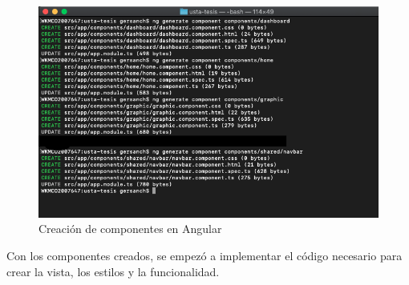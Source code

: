         \begin{figure}[H]
            \begin{center}
                \includegraphics[width = 15cm]{3Proyecto/ngComponents}
                \caption{ Creación de componentes en Angular} 
                \label{fig:ngComponents}
            \end{center}
        \end{figure}

        Con los componentes creados, se empezó a implementar el código necesario para crear la vista, los estilos y la funcionalidad.


        \begin{lstlisting}
            
        \end{lstlisting}